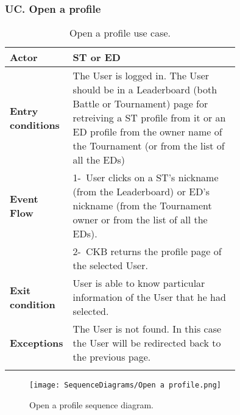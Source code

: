 \subsubsection*{UC\cuc . Open a profile}
\begin{center}
    \begin{longtable}{|l|p{0.75\linewidth}|}
        \hline
        \textbf{Actor}            & ST or ED \\
        \hline
        \textbf{Entry conditions} & The User is logged in. The User should be in a Leaderboard (both Battle or Tournament) page for retreiving a ST profile from it or an ED profile from the owner name of the Tournament (or from the list of all the EDs)        \\
        \hline
        \textbf{Event Flow}       & 1-\ User clicks on a ST's nickname (from the Leaderboard) or ED's nickname (from the Tournament owner or from the list of all the EDs).        \\
        & 2-\ CKB returns the profile page of the selected User.        \\
        \hline
        \textbf{Exit condition}   & User is able to know particular information of the User that he had selected.        \\
        \hline
        \textbf{Exceptions}        &  The User is not found. In this case the User will be redirected back to the previous page.\\
        \hline
        \caption{Open a profile use case.}
        \label{tab: open_a_profile_use_case}
    \end{longtable}
\end{center}

\begin{figure}[H]
    \begin{center}
        \texttt{[image: SequenceDiagrams/Open a profile.png]}
        \caption{Open a profile sequence diagram.}
        \label{fig:open_a_profile_seqd}%
    \end{center}
\end{figure}

\newpage

